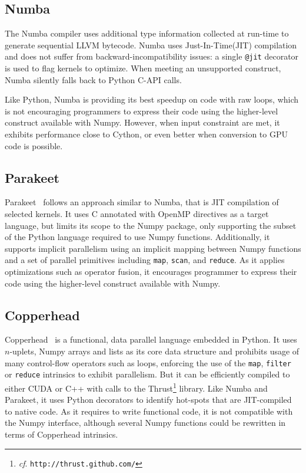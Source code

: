 \documentclass[10pt, preprint]{sigplanconf}
\begin{document}
\subsection{Numba}


The Numba compiler uses additional type information collected at run-time to
generate sequential LLVM bytecode.  Numba uses Just-In-Time(JIT) compilation
and does not suffer from backward-incompatibility issues: a single
\texttt{@jit} decorator is used to flag kernels to optimize. When meeting an
unsupported construct, Numba silently falls back to Python C-API calls.

Like Python, Numba is providing its best speedup on code with raw loops, which
is not encouraging programmers to express their code using the higher-level
construct available with Numpy. However, when input constraint are met, it
exhibits performance close to Cython, or even better when conversion to GPU
code is possible.

\subsection{Parakeet}

Parakeet~\cite{parakeet2012} follows an approach similar to Numba, that is JIT
compilation of selected kernels. It uses C annotated with OpenMP directives as
a target language, but limits its scope to the Numpy package, only supporting
the subset of the Python language required to use Numpy functions.
Additionally, it supports implicit parallelism using an implicit mapping
between Numpy functions and a set of parallel primitives including
\texttt{map}, \texttt{scan}, and \texttt{reduce}.  As it applies optimizations
such as operator fusion, it encourages programmer to express their code using
the higher-level construct available with Numpy.

\subsection{Copperhead}

Copperhead~\cite{copperhead2011} is a functional, data parallel language
embedded in Python. It uses $n$-uplets, Numpy arrays and lists as its core data
structure and prohibits usage of many control-flow operators such as loops,
enforcing the use of the \texttt{map}, \texttt{filter} or \texttt{reduce}
intrinsics to exhibit parallelism. But it can be efficiently compiled to either
CUDA or C++ with calls to the Thrust\footnote{\emph{cf}.
\texttt{http://thrust.github.com/}} library. Like Numba and Parakeet, it uses
Python decorators to identify hot-spots that are JIT-compiled to native code.
As it requires to write functional code, it is not compatible with the Numpy
interface, although several Numpy functions could be rewritten in terms of
Copperhead intrinsics.
\end{document}
